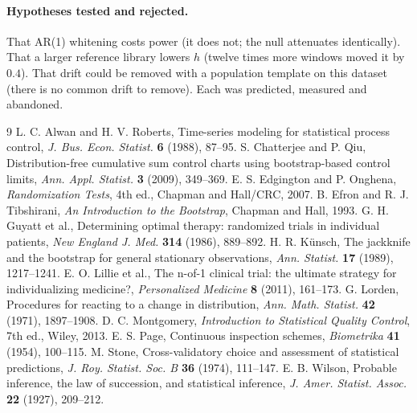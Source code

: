 \documentclass{article}
\theoremstyle{plain}
\theoremstyle{definition}
\theoremstyle{remark}
\numberwithin{equation}{section}
\begin{document}
\paragraph{Hypotheses tested and rejected.} That AR(1) whitening costs power
(it does not; the null attenuates identically). That a larger reference library
lowers $h$ (twelve times more windows moved it by $0.4$). That drift could be
removed with a population template on this dataset (there is no common drift to
remove). Each was predicted, measured and abandoned.

\begin{thebibliography}{9}
 L. C. Alwan and H. V. Roberts, Time-series modeling for statistical process control, \emph{J. Bus. Econ. Statist.} \textbf{6} (1988), 87--95.
 S. Chatterjee and P. Qiu, Distribution-free cumulative sum control charts using bootstrap-based control limits, \emph{Ann. Appl. Statist.} \textbf{3} (2009), 349--369.
 E. S. Edgington and P. Onghena, \emph{Randomization Tests}, 4th ed., Chapman and Hall/CRC, 2007.
 B. Efron and R. J. Tibshirani, \emph{An Introduction to the Bootstrap}, Chapman and Hall, 1993.
 G. H. Guyatt et al., Determining optimal therapy: randomized trials in individual patients, \emph{New England J. Med.} \textbf{314} (1986), 889--892.
 H. R. K\"unsch, The jackknife and the bootstrap for general stationary observations, \emph{Ann. Statist.} \textbf{17} (1989), 1217--1241.
 E. O. Lillie et al., The n-of-1 clinical trial: the ultimate strategy for individualizing medicine?, \emph{Personalized Medicine} \textbf{8} (2011), 161--173.
 G. Lorden, Procedures for reacting to a change in distribution, \emph{Ann. Math. Statist.} \textbf{42} (1971), 1897--1908.
 D. C. Montgomery, \emph{Introduction to Statistical Quality Control}, 7th ed., Wiley, 2013.
 E. S. Page, Continuous inspection schemes, \emph{Biometrika} \textbf{41} (1954), 100--115.
 M. Stone, Cross-validatory choice and assessment of statistical predictions, \emph{J. Roy. Statist. Soc. B} \textbf{36} (1974), 111--147.
 E. B. Wilson, Probable inference, the law of succession, and statistical inference, \emph{J. Amer. Statist. Assoc.} \textbf{22} (1927), 209--212.
\end{thebibliography}
\end{document}
